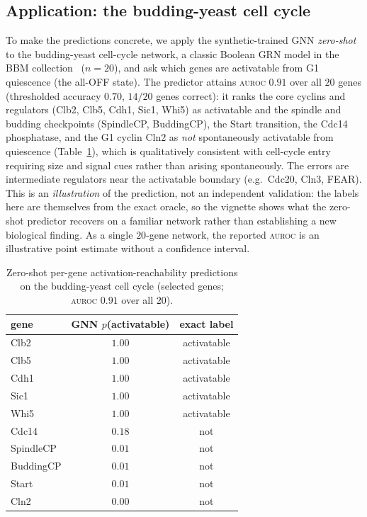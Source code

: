 \documentclass[journal]{IEEEtran}
\newcommand{\auroc}{\textsc{auroc}}
\begin{document}
\subsection{Application: the budding-yeast cell cycle}
\label{sec:vignette}
To make the predictions concrete, we apply the synthetic-trained GNN \emph{zero-shot} to
the budding-yeast cell-cycle network, a classic Boolean GRN model in the BBM
collection~\cite{yeast_cc} ($n=20$), and ask which genes
are activatable from G1 quiescence (the all-OFF state). The predictor attains \auroc{}
$0.91$ over all $20$ genes (thresholded accuracy $0.70$, $14/20$ genes correct): it ranks
the core cyclins and regulators (Clb2, Clb5, Cdh1, Sic1, Whi5) as activatable and the
spindle and budding checkpoints (SpindleCP, BuddingCP), the Start transition, the Cdc14
phosphatase, and the G1 cyclin Cln2 as
\emph{not} spontaneously activatable from quiescence (Table~\ref{tab:vignette}), which is qualitatively
consistent with cell-cycle entry requiring size and signal cues rather than arising
spontaneously. The errors are intermediate regulators near the activatable boundary
(e.g.\ Cdc20, Cln3, FEAR). This is an \emph{illustration} of the prediction, not an
independent validation: the labels here are themselves from the exact oracle, so the
vignette shows what the zero-shot predictor recovers on a familiar network rather than
establishing a new biological finding. As a single $20$-gene network, the reported
\auroc{} is an illustrative point estimate without a confidence interval.

\begin{table}[t]
\caption{Zero-shot per-gene activation-reachability predictions on the budding-yeast
cell cycle (selected genes; \auroc{} $0.91$ over all $20$).}
\label{tab:vignette}
\centering
\begin{tabular}{lcc}
\toprule
gene & GNN $p$(activatable) & exact label\\
\midrule
Clb2 & $1.00$ & activatable\\
Clb5 & $1.00$ & activatable\\
Cdh1 & $1.00$ & activatable\\
Sic1 & $1.00$ & activatable\\
Whi5 & $1.00$ & activatable\\
\midrule
Cdc14 & $0.18$ & not\\
SpindleCP & $0.01$ & not\\
BuddingCP & $0.01$ & not\\
Start & $0.01$ & not\\
Cln2 & $0.00$ & not\\
\bottomrule
\end{tabular}
\end{table}
\end{document}
